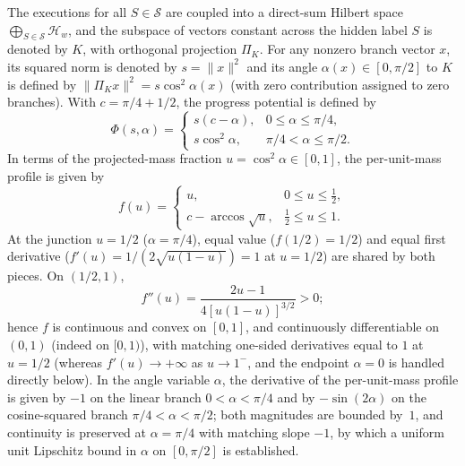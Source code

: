 \documentclass[11pt,a4paper]{article}
\theoremstyle{definition}
\theoremstyle{remark}
\begin{document}
The executions for all \(S \in \mathcal{S}\) are coupled into a direct-sum Hilbert space \(\bigoplus_{S \in \mathcal{S}} \mathcal{H}_w\), and the subspace of vectors constant across the hidden label \(S\) is denoted by \(K\), with orthogonal projection \(\Pi_K\). For any nonzero branch vector \(x\), its squared norm is denoted by \(s = \|x\|^2\) and its angle \(\alpha(x) \in [0, \pi/2]\) to \(K\) is defined by \(\|\Pi_K x\|^2 = s\cos^2\alpha(x)\) (with zero contribution assigned to zero branches). With \(c = \pi/4 + 1/2\), the progress potential is defined by
\[
  \Phi(s, \alpha) =
  \begin{cases}
    s(c - \alpha), & 0 \le \alpha \le \pi/4, \\
    s\cos^2\alpha, & \pi/4 < \alpha \le \pi/2.
  \end{cases}
\]
In terms of the projected-mass fraction \(u = \cos^2\alpha \in [0, 1]\), the per-unit-mass profile is given by
\[
  f(u) =
  \begin{cases}
    u, & 0 \le u \le \tfrac{1}{2}, \\
    c - \arccos\sqrt{u}, & \tfrac{1}{2} \le u \le 1.
  \end{cases}
\]
At the junction \(u = 1/2\) (\(\alpha = \pi/4\)), equal value (\(f(1/2) = 1/2\)) and equal first derivative (\(f'(u) = 1/(2\sqrt{u(1-u)}) = 1\) at \(u=1/2\)) are shared by both pieces. On \((1/2, 1)\),
\[
  f''(u) = \frac{2u - 1}{4[u(1-u)]^{3/2}} > 0;
\]
hence \(f\) is continuous and convex on \([0, 1]\), and continuously differentiable on \((0, 1)\) (indeed on \([0, 1)\)), with matching one-sided derivatives equal to \(1\) at \(u = 1/2\) (whereas \(f'(u) \to +\infty\) as \(u \to 1^-\), and the endpoint \(\alpha = 0\) is handled directly below). In the angle variable \(\alpha\), the derivative of the per-unit-mass profile is given by \(-1\) on the linear branch \(0 < \alpha < \pi/4\) and by \(-\sin(2\alpha)\) on the cosine-squared branch \(\pi/4 < \alpha < \pi/2\); both magnitudes are bounded by~\(1\), and continuity is preserved at \(\alpha = \pi/4\) with matching slope \(-1\), by which a uniform unit Lipschitz bound in \(\alpha\) on \([0,\pi/2]\) is established.
\end{document}
